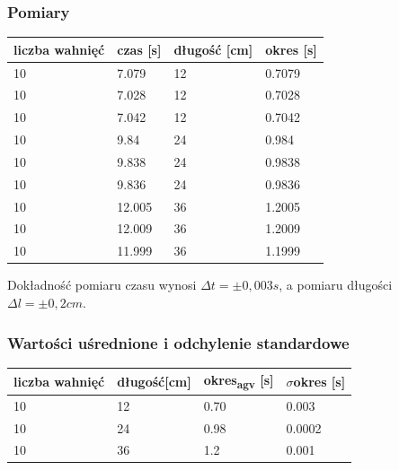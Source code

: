 \documentclass[a4paper, 11pt]{article}
\begin{document}
\subsubsection{Pomiary}
\begin{center}
	\begin{tabular}{|l|l|l|l|}
		\hline
		liczba wahnięć & czas [s] & długość [cm] & okres [s] \\ \hline
		10             & 7.079    & 12           & 0.7079    \\ \hline
		10             & 7.028    & 12           & 0.7028    \\ \hline
		10             & 7.042    & 12           & 0.7042    \\ \hline
		10             & 9.84     & 24           & 0.984     \\ \hline
		10             & 9.838    & 24           & 0.9838    \\ \hline
		10             & 9.836    & 24           & 0.9836    \\ \hline
		10             & 12.005   & 36           & 1.2005    \\ \hline
		10             & 12.009   & 36           & 1.2009    \\ \hline
		10             & 11.999   & 36           & 1.1999    \\ \hline
	\end{tabular}

\end{center}
Dokładność pomiaru czasu wynosi $\Delta t = \pm0,003s$, a pomiaru długości $\Delta l = \pm0,2cm$.

\subsubsection{Wartości uśrednione i odchylenie standardowe}
\begin{center}
	\begin{tabular}{|l|l|l|l|}
		\hline
		liczba wahnięć & długość[cm] & okres\textsubscript{agv} [s] & $\sigma$okres [s] \\ \hline
		10             & 12          & 0.70                         & 0.003             \\ \hline
		10             & 24          & 0.98                         & 0.0002            \\ \hline
		10             & 36          & 1.2                          & 0.001             \\ \hline
	\end{tabular}
\end{center}
\end{document}

